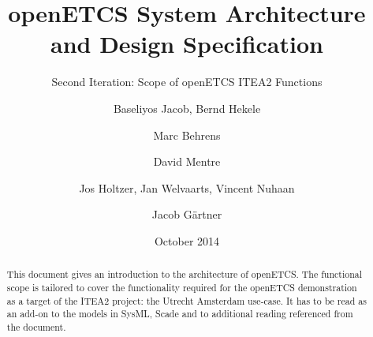 \documentclass{template/openetcs_report}
\begin{document}
\frontmatter
{}


%




\title{openETCS System Architecture and Design Specification}

\subtitle{Second Iteration: Scope of openETCS ITEA2 Functions}

\date{October 2014}



\techassessoraffil{[affiliation]}





\author{Baseliyos Jacob, Bernd Hekele}


\author{Marc Behrens}

\author{David Mentre}

\author{Jos Holtzer, Jan Welvaarts, Vincent Nuhaan}

\author{Jacob G\"artner}




\begin{abstract}
This document gives an introduction to the architecture of openETCS. The functional scope is tailored to cover the functionality required for the openETCS demonstration as a target of the ITEA2 project: the Utrecht Amsterdam use-case. It has to be read as an add-on to the models in SysML, Scade and to additional reading referenced from the document.
\end{abstract}
\end{document}
